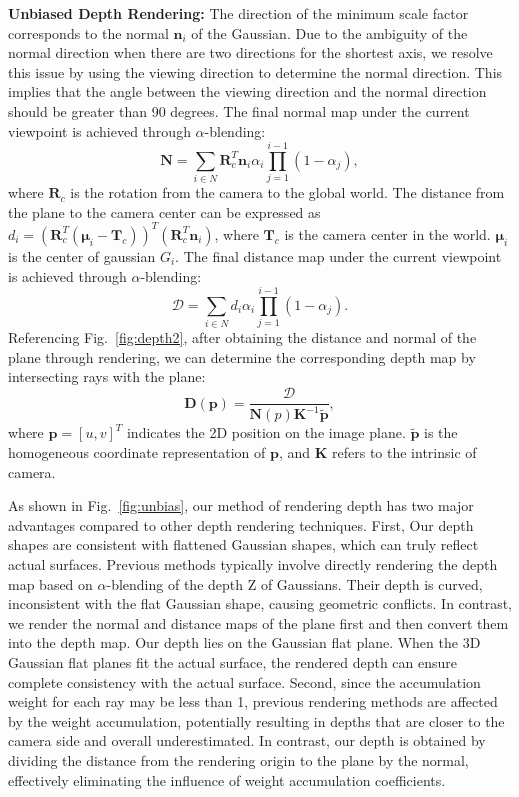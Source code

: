 \documentclass[lettersize,journal]{IEEEtran}
\begin{document}
\textbf{Unbiased Depth Rendering:}
\label{sec.Unbiased Depth Rendering} 
The direction of the minimum scale factor corresponds to the normal $\bm{n}_i$ of the Gaussian. Due to the ambiguity of the normal direction when there are two directions for the shortest axis, we resolve this issue by using the viewing direction to determine the normal direction. This implies that the angle between the viewing direction and the normal direction should be greater than 90 degrees. The final normal map under the current viewpoint is achieved through $\alpha$-blending:
\begin{equation}
    \bm{N}=\sum_{i\in N}\bm{R}_c^T\bm{n}_i\alpha_i \prod_{j=1}^{i-1}(1-\alpha_j),
\label{eq:render_normal}
\end{equation}
where $\bm{R}_c$ is the rotation from the camera to the global world. 
The distance from the plane to the camera center can be expressed as \textcolor{r}{$\textit{d}_i=(\bm{R}_c^T(\bm{\mu}_i-\bm{T}_c))^T(\bm{R}_c^T\bm{n}_i)$}, where $\bm{T}_c$ is the camera center in the world. $\bm{\mu}_i$ is the center of gaussian $G_i$. The final distance map under the current viewpoint is achieved through $\alpha$-blending:
\begin{equation}
    \bm{\mathcal{D}}=\sum_{i\in N}d_i\alpha_i \prod_{j=1}^{i-1}(1-\alpha_j).
\end{equation}
Referencing Fig.~\ref{fig:depth2}, after obtaining the distance and normal of the plane through rendering, we can determine the corresponding depth map by intersecting rays with the plane:
\begin{equation}
    \bm{D}(\bm{p})=\frac{\bm{\mathcal{D}}}{\bm{N}(p)\bm{K}^{-1}\tilde{\bm{p}}},
\end{equation}
where $\bm{p}=[u,v]^T$ indicates the 2D position on the image plane. $\tilde{\bm{p}}$ is the homogeneous coordinate representation of $\bm{p}$, and $\bm{K}$ refers to the intrinsic of camera.

As shown in Fig.~\ref{fig:unbias}, our method of rendering depth has two major advantages compared to other depth rendering techniques. First, Our depth shapes are consistent with flattened Gaussian shapes, which can truly reflect actual surfaces. Previous methods typically involve directly rendering the depth map based on $\alpha$-blending of the depth Z of Gaussians. Their depth is curved, inconsistent with the flat Gaussian shape, causing geometric conflicts. In contrast, we render the normal and distance maps of the plane first and then convert them into the depth map. Our depth lies on the Gaussian \textcolor{r}{flat plane}. When the 3D Gaussian flat planes fit the actual surface, the rendered depth can ensure complete consistency with the actual surface. Second, since the accumulation weight for each ray may be less than 1, previous rendering methods are affected by the weight accumulation, potentially resulting in depths that are closer to the camera side and overall underestimated. In contrast, our depth is obtained by dividing the distance from the rendering origin to the plane by the normal, effectively eliminating the influence of weight accumulation coefficients.
\end{document}
